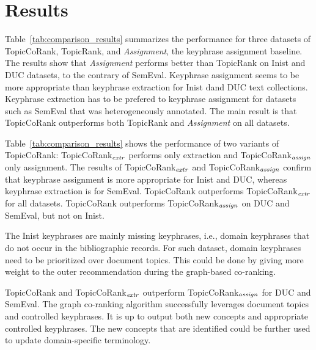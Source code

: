 \section{Results}
\label{sec:results}
  Table~\ref{tab:comparison_results} summarizes the performance for three datasets of TopicCoRank,  TopicRank, and \textit{Assignment}, the keyphrase assignment baseline.
  The results show that \textit{Assignment} performs better than TopicRank on Inist and DUC datasets, to the contrary of
  SemEval. 
  Keyphrase assignment seems to be more appropriate than keyphrase extraction for Inist dand DUC text collections.
  Keyphrase extraction has to be prefered to keyphrase assignment for datasets such as SemEval that was heterogeneously annotated. 
  The main result is that TopicCoRank outperforms both TopicRank and \textit{Assignment} on all
  datasets. 
  
  Table~\ref{tab:comparison_results} shows the performance of two variants of TopicCoRank: TopicCoRank$_\textnormal{\textit{extr}}$ performs only  extraction
  and  TopicCoRank$_\textnormal{\textit{assign}}$ only assignment.
  The results of TopicCoRank$_\textnormal{\textit{extr}}$ and 
  TopicCoRank$_\textnormal{\textit{assign}}$ confirm that keyphrase assignment is more appropriate for 
  Inist and DUC, whereas keyphrase extraction is for SemEval.
  TopicCoRank outperforms TopicCoRank$_\textnormal{\textit{extr}}$ for all datasets.
  TopicCoRank outperforms TopicCoRank$_\textnormal{\textit{assign}}$ on DUC and SemEval, but not on Inist.
  
  The Inist keyphrases are mainly missing keyphrases, i.e., domain keyphrases that do not occur in the bibliographic records. 
  For such dataset, domain keyphrases need to be prioritized over document topics. This could be done by giving more weight to the outer recommendation during the graph-based co-ranking.
  
  TopicCoRank and TopicCoRank$_\textnormal{\textit{extr}}$ outperform TopicCoRank$_\textnormal{\textit{assign}}$ for DUC and SemEval.
  The graph co-ranking algorithm successfully leverages document topics and
  controlled keyphrases. It is up to output both new concepts and appropriate controlled keyphrases.
  The new concepts that are identified could be further used to update domain-specific terminology.

